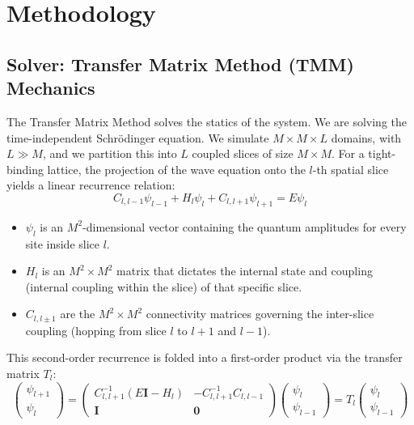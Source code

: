 \section{Methodology}
\label{sec:methodology}

\subsection{Solver: Transfer Matrix Method (TMM) Mechanics} \label{subsec:tmm}

The Transfer Matrix Method solves the statics of the system. We are solving the time-independent Schrödinger equation. We simulate $M \times M \times L$ domains, with $L \gg M$, and we partition this into $L$ coupled slices of size $M \times M$. For a tight-binding lattice, the projection of the wave equation onto the $l$-th spatial slice yields a linear recurrence relation:
\begin{equation}
C_{l, l-1} \psi_{l-1} + H_l \psi_l + C_{l, l+1} \psi_{l+1} = E \psi_l
\end{equation}
\begin{itemize}
    \item $\psi_l$ is an $M^2$-dimensional vector containing the quantum amplitudes for every site inside slice $l$.
    \item $H_l$ is an $M^2 \times M^2$ matrix that dictates the internal state and coupling (internal coupling within the slice) of that specific slice.
    \item $C_{l, l \pm 1}$ are the $M^2 \times M^2$ connectivity matrices governing the inter-slice coupling (hopping from slice $l$ to $l+1$ and $l-1$).
\end{itemize}

This second-order recurrence is folded into a first-order product via the transfer matrix $T_l$:
\begin{equation}
\begin{pmatrix} \psi_{l+1} \\ \psi_l \end{pmatrix} = \begin{pmatrix} C_{l, l+1}^{-1}(E \mathbf{I} - H_l) & -C_{l, l+1}^{-1} C_{l, l-1} \\ \mathbf{I} & \mathbf{0} \end{pmatrix} \begin{pmatrix} \psi_l \\ \psi_{l-1} \end{pmatrix} = T_l \begin{pmatrix} \psi_l \\ \psi_{l-1} \end{pmatrix}
\end{equation}

